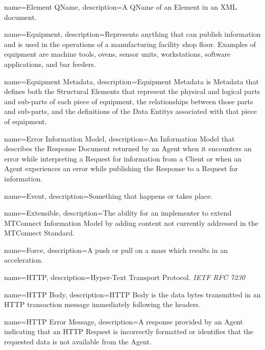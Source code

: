 {
    name={Element QName},
	description={A \gls{QName} of an \gls{Element} in an XML document.}
}

{
    name={Equipment},
	description={Represents anything that can publish information and is used in the operations of a manufacturing facility shop floor.  Examples of equipment are machine tools, ovens, sensor units, workstations, software applications, and bar feeders.}
}

{
    name={Equipment Metadata},
	description={\gls{Equipment Metadata} is {{Metadata}} that defines both the \glspl{Structural Element} that represent the physical and logical parts and sub-parts of each piece of equipment, the relationships between those parts and sub-parts, and the definitions of the \glspl{Data Entity} associated with that piece of equipment.}
}

{
    name={Error Information Model},
	description={An \gls{Information Model} that describes the \gls{Response Document} returned by an \gls{Agent} when it encounters an error while interpreting a \gls{Request} for information from a \gls{Client} or when an \gls{Agent} experiences an error while publishing the \gls{Response} to a \gls{Request} for information.}
}

{
    name={Event},
	description={Something that happens or takes place.}
}

{
    name={Extensible},
	description={The ability for an implementer to extend \gls{MTConnect Information Model} by adding content not currently addressed in the MTConnect Standard.
}
}

{
    name={Force},
	description={A push or pull on a mass which results in an acceleration.}
}

{
    name={HTTP},
	description={Hyper-Text Transport Protocol. \textit{IETF RFC 7230}
}
}

{
    name={HTTP Body},
	description={\gls{HTTP Body} is the data bytes transmitted in an HTTP transaction message immediately following the headers.}
}

{
    name={HTTP Error Message},
	description={A response provided by an \gls{Agent} indicating that an \gls{HTTP Request} is incorrectly formatted or identifies that the requested data is not available from the \gls{Agent}. }
}

